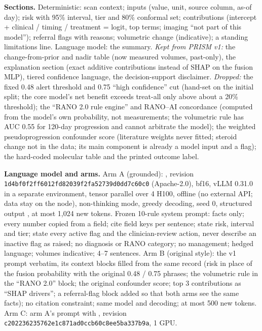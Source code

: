 \documentclass[11pt,a4paper]{article}
\begin{document}
\textbf{Sections.} Deterministic: scan context; inputs (value, unit, source column, as-of day); risk with 95\%
interval, tier and 80\% conformal set; contributions (intercept + clinical / timing / treatment = logit, top terms;
imaging ``not part of this model''); referral flags with reasons; volumetric change (indicative); a standing
limitations line. Language model: the summary. \emph{Kept from PRISM v1:} the change-from-prior and nadir table (now
measured volumes, past-only), the explanation section (exact additive contributions instead of SHAP on the fusion
MLP), tiered confidence language, the decision-support disclaimer. \emph{Dropped:} the fixed 0.48 alert threshold
and 0.75 ``high confidence'' cut (hand-set on the initial split; the core model's net benefit exceeds treat-all
only above about a 20\% threshold); the ``RANO 2.0 rule engine'' and RANO--AI concordance (computed from the model's
own probability, not measurements; the volumetric rule has AUC 0.55 for 120-day progression and cannot arbitrate
the model); the weighted pseudoprogression confounder score (literature weights never fitted; steroid change not in
the data; its main component is already a model input and a flag); the hard-coded molecular table and the
printed outcome label.

\textbf{Language model and arms.} Arm A (grounded): , revision
\texttt{\small 1d4bf0f2\allowbreak ff6012fd\allowbreak 82039f2f\allowbreak a52739d0\allowbreak dd7c60c0} (Apache-2.0), bf16, vLLM 0.31.0 in a separate environment, tensor
parallel over 4 H100, offline (no external API; data stay on the node), non-thinking mode, greedy decoding, seed 0,
structured output , at most 1,024 new tokens. Frozen 10-rule system
prompt: facts only; every number copied from a field; cite field keys per sentence; state risk, interval and tier;
state every active flag and the clinician-review action, never describe an inactive flag as raised; no diagnosis
or RANO category; no management; hedged language; volumes indicative; 4--7 sentences. Arm B (original style): the
v1  prompt verbatim, its context blocks filled from the same record (risk in place of
the fusion probability with the original 0.48 / 0.75 phrases; the volumetric rule in the ``RANO 2.0'' block; the
original confounder score; top 3 contributions as ``SHAP drivers''; a referral-flag block added so that both arms
see the same facts); no citation constraint; same model and decoding; at most 500 new tokens. Arm C: arm A's
prompt with , revision \texttt{\small c2022362\allowbreak 35762e1c\allowbreak 871ad0cc\allowbreak b60c8ee5\allowbreak ba337b9a}, 1 GPU.
\end{document}
